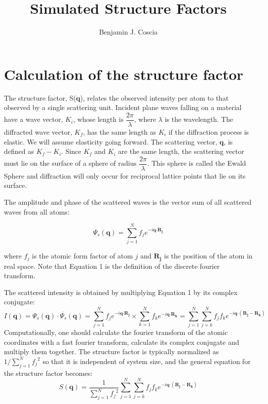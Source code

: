 \documentclass{article}
\title{Simulated Structure Factors}
\author{Benjamin J. Coscia}
\begin{document}
  \graphicspath{{./figures/}}
  \maketitle

  \section{Calculation of the structure factor}

  The structure factor, S($\mathbf{q}$), relates the observed intensity per
  atom to that observed by a single scattering unit. Incident plane waves falling
  on a material have a wave vector, $K_i$, whose length is
  $\dfrac{2\pi}{\lambda}$, where $\lambda$ is the wavelength. The diffracted wave
  vector, $K_f$, has the same length as $K_i$ if the diffraction process is 
  elastic. We will assume elasticity going forward. The scattering vector, $\mathbf{q}$,
  is defined as $K_f - K_i$. Since $K_f$ and $K_i$ are the same length, the scattering
  vector must lie on the surface of a sphere of radius $\dfrac{2\pi}{\lambda}$. This
  sphere is called the Ewald Sphere and diffraction will only occur for reciprocal
  lattice points that lie on its surface. 

  The amplitude and phase of the scattered waves is the vector sum of all scattered 
  waves from all atoms:

  \begin{equation}\label{eq:dft}
  \Psi_s(\mathbf{q}) = \sum_{j=1}^{N}f_je^{-i\mathbf{q}\boldsymbol{\cdot}\mathbf{R_j}}
  \end{equation}

  where $f_j$ is the atomic form factor of atom $j$ and $\mathbf{R_j}$ is the position of
  the atom in real space. Note that Equation 1 %
  is the definition of the discrete fourier transform.

  The scattered intensity is obtained by multiplying Equation 1%
  by its complex conjugate:
  \begin{equation}\label{eqn:conjugate}
  I(\mathbf{q}) = \Psi_s(\mathbf{q})\cdot\overline{\Psi_s}(\mathbf{q}) = \sum_{j=1}^{N}f_je^{-i\mathbf{q}\boldsymbol{\cdot}\mathbf{R_j}} \times \sum_{k=1}^{N}f_ke^{-i\mathbf{q}\boldsymbol{\cdot}\mathbf{R_k}} = \sum_{j=1}^{N}\sum_{j=k}^{N}f_jf_ke^{-i\mathbf{q}\boldsymbol{\cdot}(\mathbf{R_j}- \mathbf{R_k})}
  \end{equation}
  Computationally, one should calculate the fourier transform of the atomic
  coordinates with a fast fourier transform, calculate its complex conjugate and 
  multiply them together. The structure factor is typically normalized as 
  $ 1 / {\sum_{j=1}^{N} {f_j}^2}$ so that it is independent of system size, and
  the general equation for the structure factor becomes:
  \begin{equation}\label{eqn:general_sf}
  S(\mathbf{q})= \dfrac{1}{\sum_{j=1}^{N} {f_j}^2}\sum_{j=1}^{N}\sum_{j=k}^{N}f_jf_ke^{-i\mathbf{q}\boldsymbol{\cdot}(\mathbf{R_j}- \mathbf{R_k})}
  \end{equation}
 
\end{document}
